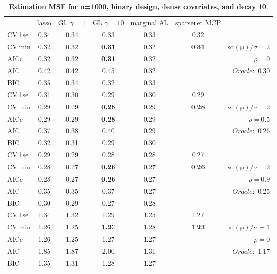 \begin{table}\vspace{-.5cm}
\caption[l]{ { \bf Estimation MSE for n=1000, binary design, 
dense covariates, and  decay  10}.}
\vspace{-.5cm}
\footnotesize{}
\begin{center}
\begin{tabular}{l*{5}{c}|r}
& lasso & GL $\gamma=1$ & GL $\gamma=10$ & marginal AL & sparsenet MCP  & \\
 \cline{1-7}
CV.1se & 0.34 & 0.34 & 0.33 & 0.33 & 0.32 & \\
CV.min & 0.32 & 0.32 & {\bf 0.31} & 0.32 & {\bf 0.31} &  $\mathrm{sd}(\mathbf{\mu})/\sigma=2$ \\
AICc & 0.32 & 0.32 & {\bf 0.31} & 0.32 & & $\rho=0$ \\
AIC & 0.42 & 0.42 & 0.45 & 0.32 & &  \multirow{2}{*}{$Oracle: $ 0.30} \\
BIC & 0.35 & 0.34 & 0.32 & 0.33 & &  \\
 \hline 
CV.1se & 0.31 & 0.30 & 0.29 & 0.30 & 0.29 & \\
CV.min & 0.29 & 0.29 & {\bf 0.28} & 0.29 & {\bf 0.28} &  $\mathrm{sd}(\mathbf{\mu})/\sigma=2$ \\
AICc & 0.29 & 0.29 & {\bf 0.28} & 0.29 & & $\rho=0.5$ \\
AIC & 0.37 & 0.38 & 0.40 & 0.29 & &  \multirow{2}{*}{$Oracle: $ 0.26} \\
BIC & 0.32 & 0.31 & 0.29 & 0.30 & &  \\
 \hline 
CV.1se & 0.29 & 0.29 & 0.28 & 0.28 & 0.27 & \\
CV.min & 0.28 & 0.27 & {\bf 0.26} & 0.27 & {\bf 0.26} &  $\mathrm{sd}(\mathbf{\mu})/\sigma=2$ \\
AICc & 0.28 & 0.27 & {\bf 0.26} & 0.27 & & $\rho=0.9$ \\
AIC & 0.35 & 0.35 & 0.37 & 0.27 & &  \multirow{2}{*}{$Oracle: $ 0.25} \\
BIC & 0.30 & 0.29 & 0.27 & 0.28 & &  \\
 \hline 
CV.1se & 1.34 & 1.32 & 1.29 & 1.25 & 1.27 & \\
CV.min & 1.26 & 1.25 & {\bf 1.23} & 1.28 & {\bf 1.23} &  $\mathrm{sd}(\mathbf{\mu})/\sigma=1$ \\
AICc & 1.26 & 1.25 & 1.27 & 1.27 & & $\rho=0$ \\
AIC & 1.85 & 1.87 & 2.00 & 1.31 & &  \multirow{2}{*}{$Oracle: $ 1.17} \\
BIC & 1.35 & 1.31 & 1.28 & 1.27 & &  \\

\end{tabular}
\end{center}
\end{table}
